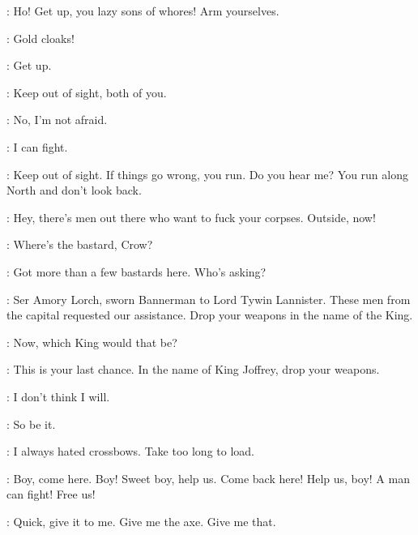 
\YOREN: Ho! Get up, you lazy sons of whores! Arm yourselves. 

\GENDRY: Gold cloaks! 

\ARYA: Get up. 

\YOREN: Keep out of sight, both of you. 

\ARYA: No, I'm not afraid. 

\GENDRY: I can fight. 

\YOREN: Keep out of sight. If things go wrong, you run. Do you hear me? You run along North and don't look back. 


\YOREN: Hey, there's men out there who want to fuck your corpses. Outside, now! 


\AMORY: Where's the bastard, Crow? 

\YOREN: Got more than a few bastards here. Who's asking? 

\AMORY: Ser Amory Lorch, sworn Bannerman to Lord Tywin Lannister. These men from the capital requested our assistance. Drop your weapons in the name of the King. 

\YOREN: Now, which King would that be? 

\AMORY: This is your last chance. In the name of King Joffrey, drop your weapons. 

\YOREN: I don't think I will. 

\AMORY: So be it. 


\YOREN: I always hated crossbows. Take too long to load. 


\JAQEN: Boy, come here. Boy! Sweet boy, help us. Come back here! Help us, boy! A man can fight! Free us! 


\JAQEN: Quick, give it to me. Give me the axe. Give me that. 



